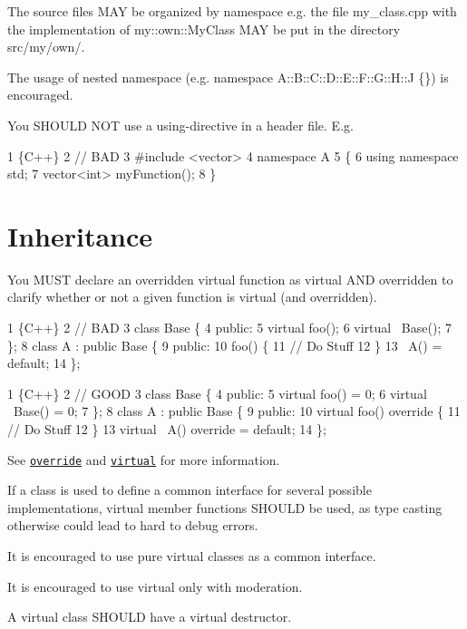 The source files M\+AY be organized by namespace e.\+g. the file {\ttfamily my\+\_\+class.\+cpp} with the implementation of {\ttfamily my\+::own\+::\+My\+Class} M\+AY be put in the directory {\ttfamily src/my/own/}.

The usage of nested namespace (e.\+g. {\ttfamily namespace A\+::\+B\+::\+C\+::\+D\+::\+E\+::\+F\+::\+G\+::\+H\+::J \{\}}) is encouraged.

You S\+H\+O\+U\+LD N\+OT use a using-\/directive in a header file. E.\+g. 
\begin{DoxyCode}
1 \{C++\}
2 // BAD
3 #include <vector>
4 namespace A
5 \{
6     using namespace std;
7     vector<int> myFunction();
8 \}
\end{DoxyCode}


\section*{Inheritance}

You M\+U\+ST declare an overridden virtual function as virtual A\+ND overridden to clarify whether or not a given function is virtual (and overridden). 
\begin{DoxyCode}
1 \{C++\}
2 // BAD
3 class Base \{
4     public:
5     virtual foo();
6     virtual ~Base();
7 \};
8 class A : public Base \{
9     public:
10     foo() \{
11         // Do Stuff
12     \}
13     ~A() = default;
14 \};
\end{DoxyCode}
 
\begin{DoxyCode}
1 \{C++\}
2 // GOOD
3 class Base \{
4     public:
5     virtual foo() = 0;
6     virtual ~Base() = 0;
7 \};
8 class A : public Base \{
9     public:
10     virtual foo() override \{
11         // Do Stuff
12     \}
13     virtual ~A() override = default;
14 \};
\end{DoxyCode}
 See \href{https://en.cppreference.com/w/cpp/language/override}{\tt override} and \href{https://en.cppreference.com/w/cpp/language/virtual}{\tt virtual} for more information.

If a class is used to define a common interface for several possible implementations, virtual member functions S\+H\+O\+U\+LD be used, as type casting otherwise could lead to hard to debug errors.

It is encouraged to use pure virtual classes as a common interface.

It is encouraged to use {\ttfamily virtual} only with moderation.

A {\ttfamily virtual} class S\+H\+O\+U\+LD have a {\ttfamily virtual} destructor.

